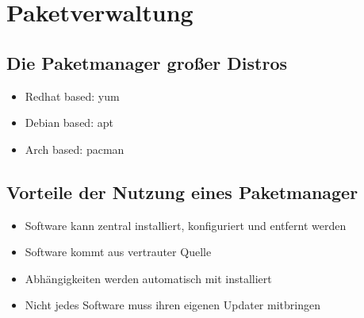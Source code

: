 \documentclass[
    ngerman,
    accentcolor=3b,
    dark_mode,
    fontsize= 12pt,
    a4paper,
    aspectratio=169,
    colorback=true,
    fancy_row_colors,
    leqno,
    fleqn,
    boxarc=3pt,
    fleqn,
]{algoslides}
\begin{document}
    \section{Paketverwaltung}\label{package-management}\label{Paketverwaltung}
    \subsection{Die Paketmanager großer Distros}
    \begin{frame}
        \slidehead{}
        \begin{itemize}
            \item Redhat based: {\ttfamily yum}
            \item Debian based: {\ttfamily apt}
            \item Arch based: {\ttfamily pacman}
        \end{itemize}
    \end{frame}
    \subsection{Vorteile der Nutzung eines Paketmanager}
    \begin{frame}
        \slidehead{}
        \begin{itemize}
            \item Software kann zentral installiert, konfiguriert und entfernt werden
            \item Software kommt aus vertrauter Quelle
            \item Abhängigkeiten werden automatisch mit installiert
            \item Nicht jedes Software muss ihren eigenen Updater mitbringen
        \end{itemize}
    \end{frame}
\end{document}
